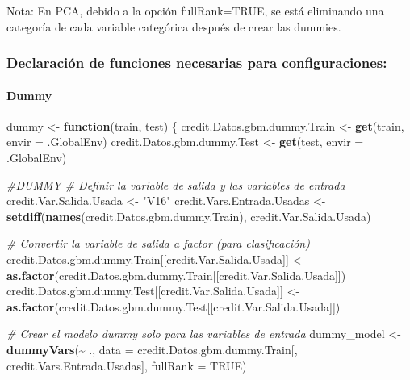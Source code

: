 \documentclass[
]{article}
\newenvironment{Shaded}{\begin{snugshade}}{\end{snugshade}}
\newcommand{\AttributeTok}[1]{\textcolor[rgb]{0.13,0.29,0.53}{#1}}
\newcommand{\CommentTok}[1]{\textcolor[rgb]{0.56,0.35,0.01}{\textit{#1}}}
\newcommand{\ConstantTok}[1]{\textcolor[rgb]{0.56,0.35,0.01}{#1}}
\newcommand{\ControlFlowTok}[1]{\textcolor[rgb]{0.13,0.29,0.53}{\textbf{#1}}}
\newcommand{\FunctionTok}[1]{\textcolor[rgb]{0.13,0.29,0.53}{\textbf{#1}}}
\newcommand{\NormalTok}[1]{#1}
\newcommand{\OtherTok}[1]{\textcolor[rgb]{0.56,0.35,0.01}{#1}}
\newcommand{\SpecialCharTok}[1]{\textcolor[rgb]{0.81,0.36,0.00}{\textbf{#1}}}
\newcommand{\StringTok}[1]{\textcolor[rgb]{0.31,0.60,0.02}{#1}}
\begin{document}
Nota: En PCA, debido a la opción fullRank=TRUE, se está eliminando una
categoría de cada variable categórica después de crear las dummies.

\hypertarget{declaraciuxf3n-de-funciones-necesarias-para-configuraciones}{%
\subsubsection{Declaración de funciones necesarias para
configuraciones:}\label{declaraciuxf3n-de-funciones-necesarias-para-configuraciones}}

\hypertarget{dummy}{%
\paragraph{Dummy}\label{dummy}}

\begin{Shaded}
\begin{Highlighting}[]
\NormalTok{dummy }\OtherTok{\textless{}{-}} \ControlFlowTok{function}\NormalTok{(train, test) \{}
\NormalTok{  credit.Datos.gbm.dummy.Train }\OtherTok{\textless{}{-}} \FunctionTok{get}\NormalTok{(train, }\AttributeTok{envir =}\NormalTok{ .GlobalEnv)}
\NormalTok{  credit.Datos.gbm.dummy.Test }\OtherTok{\textless{}{-}} \FunctionTok{get}\NormalTok{(test, }\AttributeTok{envir =}\NormalTok{ .GlobalEnv)}
  
  \CommentTok{\#DUMMY}
  \CommentTok{\# Definir la variable de salida y las variables de entrada}
\NormalTok{  credit.Var.Salida.Usada }\OtherTok{\textless{}{-}} \StringTok{"V16"}
\NormalTok{  credit.Vars.Entrada.Usadas }\OtherTok{\textless{}{-}} \FunctionTok{setdiff}\NormalTok{(}\FunctionTok{names}\NormalTok{(credit.Datos.gbm.dummy.Train), credit.Var.Salida.Usada)}
  
  \CommentTok{\# Convertir la variable de salida a factor (para clasificación)}
\NormalTok{  credit.Datos.gbm.dummy.Train[[credit.Var.Salida.Usada]] }\OtherTok{\textless{}{-}} \FunctionTok{as.factor}\NormalTok{(credit.Datos.gbm.dummy.Train[[credit.Var.Salida.Usada]])}
\NormalTok{  credit.Datos.gbm.dummy.Test[[credit.Var.Salida.Usada]] }\OtherTok{\textless{}{-}} \FunctionTok{as.factor}\NormalTok{(credit.Datos.gbm.dummy.Test[[credit.Var.Salida.Usada]])}
  
  \CommentTok{\# Crear el modelo dummy solo para las variables de entrada}
\NormalTok{  dummy\_model }\OtherTok{\textless{}{-}} \FunctionTok{dummyVars}\NormalTok{(}\SpecialCharTok{\textasciitilde{}}\NormalTok{ ., }\AttributeTok{data =}\NormalTok{ credit.Datos.gbm.dummy.Train[, credit.Vars.Entrada.Usadas], }\AttributeTok{fullRank =} \ConstantTok{TRUE}\NormalTok{)}
  

\end{Highlighting}
\end{Shaded}
\end{document}
